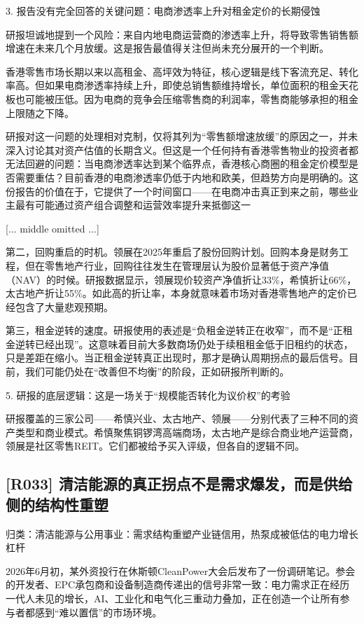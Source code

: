 \documentclass[11pt]{ctexart}
\begin{document}
3. 报告没有完全回答的关键问题：电商渗透率上升对租金定价的长期侵蚀

研报坦诚地提到一个风险：来自内地电商运营商的渗透率上升，将导致零售销售额增速在未来几个月放缓。这是报告最值得关注但尚未充分展开的一个判断。

香港零售市场长期以来以高租金、高坪效为特征，核心逻辑是线下客流充足、转化率高。但如果电商渗透率持续上升，即使总销售额维持增长，单位面积的租金天花板也可能被压低。因为电商的竞争会压缩零售商的利润率，零售商能够承担的租金上限随之下降。

研报对这一问题的处理相对克制，仅将其列为“零售额增速放缓”的原因之一，并未深入讨论其对资产估值的长期含义。但这是一个任何持有香港零售物业的投资者都无法回避的问题：当电商渗透率达到某个临界点，香港核心商圈的租金定价模型是否需要重估？目前香港的电商渗透率仍低于内地和欧美，但趋势方向是明确的。这份报告的价值在于，它提供了一个时间窗口——在电商冲击真正到来之前，哪些业主最有可能通过资产组合调整和运营效率提升来抵御这一

[... middle omitted ...]



第二，回购重启的时机。领展在2025年重启了股份回购计划。回购本身是财务工程，但在零售地产行业，回购往往发生在管理层认为股价显著低于资产净值（NAV）的时候。研报数据显示，领展现价较资产净值折让33\%，希慎折让66\%，太古地产折让55\%。如此高的折让率，本身就意味着市场对香港零售地产的定价已经包含了大量悲观预期。

第三，租金逆转的速度。研报使用的表述是“负租金逆转正在收窄”，而不是“正租金逆转已经出现”。这意味着目前大多数商场仍处于续租租金低于旧租约的状态，只是差距在缩小。当正租金逆转真正出现时，那才是确认周期拐点的最后信号。目前，我们可能仍处在“改善但不均衡”的阶段，正如研报所判断的。

5. 研报的底层逻辑：这是一场关于“规模能否转化为议价权”的考验

研报覆盖的三家公司——希慎兴业、太古地产、领展——分别代表了三种不同的资产类型和商业模式。希慎聚焦铜锣湾高端商场，太古地产是综合商业地产运营商，领展是社区零售REIT。它们都被给予买入评级，但各自的逻辑不同。

\subsection{[R033] 清洁能源的真正拐点不是需求爆发，而是供给侧的结构性重塑}
{\small\color{refgray}归类：清洁能源与公用事业：需求结构重塑产业链信用，热泵成被低估的电力增长杠杆}

2026年6月初，某外资投行在休斯顿CleanPower大会后发布了一份调研笔记。参会的开发者、EPC承包商和设备制造商传递出的信号非常一致：电力需求正在经历一代人未见的增长，AI、工业化和电气化三重动力叠加，正在创造一个让所有参与者都感到“难以置信”的市场环境。
\end{document}
